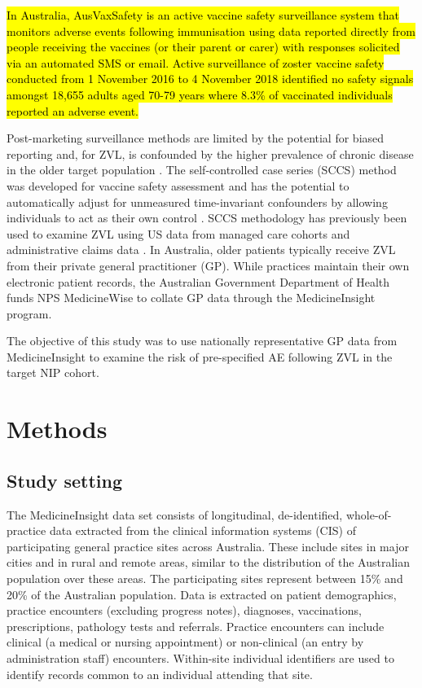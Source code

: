 \documentclass[review, endfloat]{elsarticle}
\begin{document}
\hl{In Australia, AusVaxSafety is an active vaccine safety surveillance system that monitors adverse events following immunisation using data reported directly from people receiving the vaccines (or their parent or carer) with responses solicited via an automated SMS or email. Active surveillance of zoster vaccine safety conducted from 1 November 2016 to 4 November 2018 identified no safety signals amongst 18,655 adults aged 70-79 years where 8.3\% of vaccinated individuals reported an adverse event.}

Post-marketing surveillance methods are limited by the potential for biased reporting and, for ZVL, is confounded by the higher prevalence of chronic disease in the older target population \citep{miller2018post}. The self-controlled case series (SCCS) method was developed for vaccine safety assessment and has the potential to automatically adjust for unmeasured time-invariant confounders by allowing individuals to act as their own control \citep{petersen2016}. SCCS methodology has previously been used to examine ZVL using US data from managed care cohorts \citep{tseng2012} and administrative claims data \citep{minassian2015}. In Australia, older patients typically receive ZVL from their private general practitioner (GP). While practices maintain their own electronic patient records, the Australian Government Department of Health funds NPS MedicineWise to collate GP data through the MedicineInsight program. 

The objective of this study was to use nationally representative GP data from MedicineInsight to examine the risk of pre-specified AE following ZVL in the target NIP cohort.

\section{Methods}

\subsection{Study setting}

The MedicineInsight data set consists of longitudinal, de-identified, whole-of-practice data extracted from the clinical information systems (CIS) of participating general practice sites across Australia. These include sites in major cities and in rural and remote areas, similar to the distribution of the Australian population over these areas. The participating sites represent between 15\% and 20\% of the Australian population.  Data is extracted on patient demographics, practice encounters (excluding progress notes), diagnoses, vaccinations, prescriptions, pathology tests and referrals. Practice encounters can include clinical (a medical or nursing appointment) or non-clinical (an entry by administration staff) encounters. Within-site individual identifiers are used to identify records common to an individual attending that site. 
\end{document}
